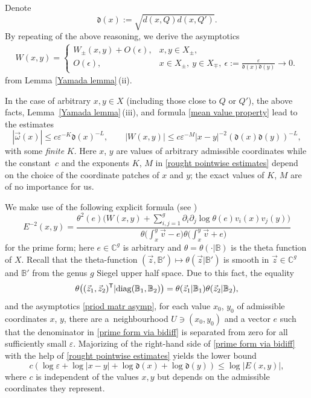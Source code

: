 \documentclass[pdftex]{sigma}
\numberwithin{equation}{section}
\theoremstyle{definition}
\begin{document}
Denote
\[\mathfrak{d}(x):=\sqrt{ d(x,Q) d(x,Q')}.\]
By repeating of the above reasoning, we derive the asymptotics
\begin{align*}
W(x,y)=\begin{cases}
W_\pm(x,y)+O(\epsilon), & x,y\in X_\pm, \\
O(\epsilon), & x\in X_\pm, \ y\in X_\mp, \ \epsilon:=\frac{\varepsilon}{\mathfrak{d}(x)\mathfrak{d}(y)}\to 0.
\end{cases}
\end{align*}
from Lemma \ref{Yamada lemma}\,(ii).

In the case of arbitrary $x,y\in X$ (including those close to $Q$ or $Q'$), the above facts, Lemma~\ref{Yamada lemma}\,(iii), and formula \eqref{mean value property} lead to the estimates
\begin{equation}
\label{rought pointwise estimates}
|\vec{\omega}(x)|\le c\varepsilon^{-K}\mathfrak{d}(x)^{-L}, \qquad
|W(x,y)|\le c\varepsilon^{-M}|x-y|^{-2}(\mathfrak{d}(x)\mathfrak{d}(y))^{-L},
\end{equation}
with some {\it finite} $K$. Here $x$, $y$ are values of arbitrary admissible coordinates while the constant~$c$ and the exponents $K$, $M$ in \eqref{rought pointwise estimates} depend on the choice of the coordinate patches of $x$ and $y$; the exact values of $K$, $M$ are of no importance for us.

We make use of the following explicit formula (see \cite[Corollary 2.12]{Fay1})
\begin{equation}
\label{prime form via bidiff}
E^{-2}(x,y)=\frac{\theta^2(e)\bigl(W(x,y)+\sum_{i,j=1}^{g}\partial_i\partial_j\log \theta(e)v_i(x)v_j(y)\bigr)}{\theta\bigl(\int_x^y\vec{v}-e\bigr)\theta\bigl(\int_x^y\vec{v}+e\bigr)}
\end{equation}
for the prime form; here $e\in\mathbb{C}^{g}$ is arbitrary and $\theta=\theta(\cdot|\mathbb{B})$ is the theta function of $X$. Recall that the theta-function $(\vec{z},\mathbb{B}')\mapsto\theta(\vec{z}|\mathbb{B}')$ is smooth in $\vec{z}\in\mathbb{C}^g$ and $\mathbb{B}'$ from the genus $g$ Siegel upper half space. Due to this fact, the equality
\[\theta\bigl((\vec{z}_1,\vec{z}_2)^{\mathsf T}|{\rm diag}(\mathbb{B}_1,\mathbb{B}_2)\bigr)=\theta(\vec{z}_1|\mathbb{B}_1)\theta(\vec{z}_2|\mathbb{B}_2),\]
and the asymptotics \eqref{priod matr asymp}, for each value $x_0$, $y_0$ of admissible coordinates $x$, $y$, there are a~neighbourhood $U\ni(x_0,y_0)$ and a vector $e$ such that the denominator in \eqref{prime form via bidiff} is separated from zero for all sufficiently small $\varepsilon$. Majorizing of the right-hand side of \eqref{prime form via bidiff} with the help of \eqref{rought pointwise estimates} yields the lower bound
\begin{equation}
\label{prime form estimate 1}
c(\log \varepsilon+\log |x-y|+\log \mathfrak{d}(x)+\log \mathfrak{d}(y))\le \log |E(x,y)|,
\end{equation}
 where $c$ is independent of the values $x,y$ but depends on the admissible coordinates they represent.
\end{document}
